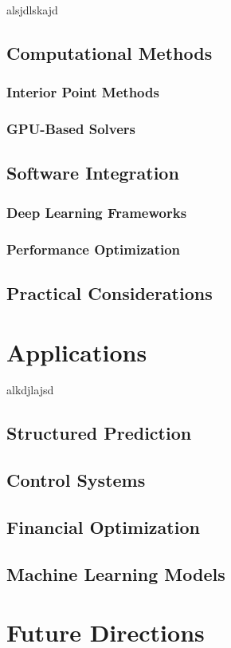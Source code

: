 \documentclass{article}
\begin{document}
alsjdlskajd
\subsection{Computational Methods}
    \subsubsection{Interior Point Methods}
    \subsubsection{GPU-Based Solvers}
\subsection{Software Integration}
    \subsubsection{Deep Learning Frameworks}
    \subsubsection{Performance Optimization}
\subsection{Practical Considerations}

\section{Applications}

alkdjlajsd
\subsection{Structured Prediction}
\subsection{Control Systems}
\subsection{Financial Optimization}
\subsection{Machine Learning Models}

\section{Future Directions}
\end{document}
